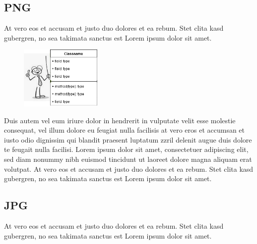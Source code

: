 \documentclass[11pt]{scrartcl}
\begin{document}
\subsection{PNG}

At vero eos et accusam et justo duo dolores et ea rebum. Stet clita kasd gubergren, no sea takimata sanctus est Lorem ipsum dolor sit amet.

\begin{figure}
 \vspace{-16pt}
 \centering 
 \includegraphics[width=0.35\textwidth]{DrawIO/Diagramm_mit_Image.png}
 \label{fig:Diagramm-mit-Image-png}
 \vspace{-10pt}
\end{figure}
Duis autem vel eum iriure dolor in hendrerit in vulputate velit esse molestie consequat, vel illum dolore eu feugiat nulla facilisis at vero eros et accumsan et iusto odio dignissim qui blandit praesent luptatum zzril delenit augue duis dolore te feugait nulla facilisi. Lorem ipsum dolor sit amet, consectetuer adipiscing elit, sed diam nonummy nibh euismod tincidunt ut laoreet dolore magna aliquam erat volutpat.
At vero eos et accusam et justo duo dolores et ea rebum. Stet clita kasd gubergren, no sea takimata sanctus est Lorem ipsum dolor sit amet.

\subsection{JPG}
At vero eos et accusam et justo duo dolores et ea rebum. Stet clita kasd gubergren, no sea takimata sanctus est Lorem ipsum dolor sit amet.
\end{document}
